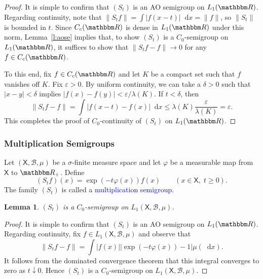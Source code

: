 \documentclass[12pt, reqno]{amsart}
\renewcommand{\leq}{\leqslant}
\renewcommand{\geq}{\geqslant}
\newcommand{\1}{\mathbbm 1}
\newcommand*\diff{\mathop{}\!\mathrm{d}}
\newcommand{\bB}{\mathcal B}
\newcommand{\RR}{\mathbbm R}
\newcommand{\Xsf}{\mathsf X}
\renewcommand{\phi}{\varphi}
\renewcommand{\epsilon}{\varepsilon}
\theoremstyle{plain}
\newtheorem{lemma}[theorem]{Lemma}
\theoremstyle{definition}
\newcommand{\navy}[1]{\textcolor{blue}{#1}}
\begin{document}
\begin{proof}
    It is simple to confirm that $(S_t)$ is an AO semigroup on $L_1(\RR)$.
    Regarding continuity, note that $\|S_t f\| = \int |f(x-t)| \diff x = \| f\|$, so
    $\|S_t\|$ is bounded in $t$.  Since $C_c(\RR)$ is dense in $L_1(\RR)$ under this
    norm, Lemma~\ref{l:aose} implies that, to show $(S_t)$ is a $C_0$-semigroup
    on $L_1(\RR)$, it suffices to show that $\| S_t f - f \| \to 0$ for any $f \in
    C_c(\RR)$.

    To this end, fix $f \in C_c(\RR)$ and let $K$ be a compact set such that $f$
    vanishes off $K$.  Fix $\epsilon > 0$.  By uniform continuity, we can take a
    $\delta > 0$ such that $|x-y| < \delta$ implies $|f(x) - f(y)| < \epsilon /
    \lambda(K)$.  If $t < \delta$, then
    \begin{equation*}
        \| S_t f - f \| 
        = \int | f(x-t) - f(x) | \diff x
        \leq \lambda(K) \frac{\epsilon}{\lambda(K)} = \epsilon.
    \end{equation*}
    This completes the proof of $C_0$-continuity of $(S_t)$ on $L_1(\RR)$.
\end{proof}


\subsubsection{Multiplication Semigroups}\label{ss:multisemi}

Let $(\Xsf, \bB, \mu)$ be a $\sigma$-finite measure space and let
$\phi$ be a measurable map from $\Xsf$ to $\RR_+$.  Define
%
\begin{equation*}
    (S_t f)(x)= \exp(-t \phi(x)) f(x) 
    \qquad (x \in \Xsf, \; t \geq 0).
\end{equation*}
%
The family $(S_t)$ is called a \navy{multiplication semigroup}.

\begin{lemma}\label{l:multisemi}
    $(S_t)$ is a $C_0$-semigroup on $L_1(\Xsf, \bB, \mu)$.
\end{lemma}

\begin{proof}
    It is simple to confirm that $(S_t)$ is an AO semigroup on $L_1(\RR)$.
    Regarding continuity, fix $f \in L_1(\Xsf, \bB, \mu)$ and observe that
    \begin{equation*}
        \| S_t f - f \|
        = \int |f(x)| | \exp(-t\phi(x)) - 1 | \mu(\diff x).
    \end{equation*}
    It follows from the dominated convergence theorem that this integral
    converges to zero as $t \downarrow 0$.  Hence $(S_t)$ is a $C_0$-semigroup
    on $L_1(\Xsf, \bB, \mu)$.
\end{proof}
\end{document}
